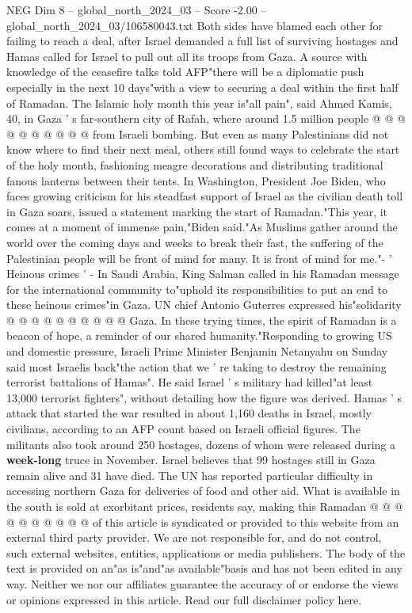 \begin{textsample}{NEG Dim 8 – global\_north\_2024\_03 – Score -2.00 – global\_north\_2024\_03/106580043.txt}
Both sides have blamed each other for failing to reach a deal, after Israel demanded a full list of surviving hostages and Hamas called for Israel to pull out all its troops from Gaza.
A source with knowledge of the ceasefire talks told AFP"there will be a diplomatic push especially in the next 10 days"with a view to securing a deal within the first half of Ramadan.
The Islamic holy month this year is"all pain", said Ahmed Kamis, 40, in Gaza ' s far-southern city of Rafah, where around 1.5 million people @ @ @ @ @ @ @ @ @ @ from Israeli bombing.
But even as many Palestinians did not know where to find their next meal, others still found ways to celebrate the start of the holy month, fashioning meagre decorations and distributing traditional fanous lanterns between their tents.
In Washington, President Joe Biden, who faces growing criticism for his steadfast support of Israel as the civilian death toll in Gaza soars, issued a statement marking the start of Ramadan."This year, it comes at a moment of immense pain,"Biden said."As Muslims gather around the world over the coming days and weeks to break their fast, the suffering of the Palestinian people will be front of mind for many.
It is front of mind for me."- ' Heinous crimes ' - In Saudi Arabia, King Salman called in his Ramadan message for the international community to"uphold its responsibilities to put an end to these heinous crimes"in Gaza.
UN chief Antonio Guterres expressed his"solidarity @ @ @ @ @ @ @ @ @ @ Gaza.
In these trying times, the spirit of Ramadan is a beacon of hope, a reminder of our shared humanity."Responding to growing US and domestic pressure, Israeli Prime Minister Benjamin Netanyahu on Sunday said most Israelis back"the action that we ' re taking to destroy the remaining terrorist battalions of Hamas".
He said Israel ' s military had killed"at least 13,000 terrorist fighters", without detailing how the figure was derived.
Hamas ' s attack that started the war resulted in about 1,160 deaths in Israel, mostly civilians, according to an AFP count based on Israeli official figures.
The militants also took around 250 hostages, dozens of whom were released during a \textbf{week-long} truce in November.
Israel believes that 99 hostages still in Gaza remain alive and 31 have died.
The UN has reported particular difficulty in accessing northern Gaza for deliveries of food and other aid.
What is available in the south is sold at exorbitant prices, residents say, making this Ramadan @ @ @ @ @ @ @ @ @ @ of this article is syndicated or provided to this website from an external third party provider.
We are not responsible for, and do not control, such external websites, entities, applications or media publishers.
The body of the text is provided on an"as is"and"as available"basis and has not been edited in any way.
Neither we nor our affiliates guarantee the accuracy of or endorse the views or opinions expressed in this article.
Read our full disclaimer policy here.

\end{textsample}
